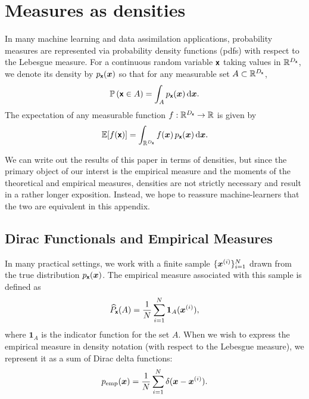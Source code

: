 \documentclass[wcp]{jmlr} %
\begin{document}



\appendix

\section{Measures as densities}\label{sec:densities-please}

In many machine learning and data assimilation applications, probability measures are represented via probability density functions (pdfs) with respect to the Lebesgue measure. For a continuous random variable \(\boldsymbol{\mathsf{x}}\) taking values in \(\mathbb{R}^{D_{\boldsymbol{\mathsf{x}}}}\), we denote its density by \(p_{\boldsymbol{\mathsf{x}}}(\boldsymbol{x})\) so that for any measurable set \(A \subset \mathbb{R}^{D_{\boldsymbol{\mathsf{x}}}}\),
\begin{equation}
    \mathbb{P}\left(\boldsymbol{\mathsf{x}} \in A\right)
    = \int_A p_{\boldsymbol{\mathsf{x}}}(\boldsymbol{x})\,\mathrm{d}\boldsymbol{x}.
\end{equation}
The expectation of any measurable function \(f:\mathbb{R}^{D_{\boldsymbol{\mathsf{x}}}}\to\mathbb{R}\) is given by
\begin{equation}
    \mathbb{E}[f(\boldsymbol{\mathsf{x}})] = \int_{\mathbb{R}^{D_{\boldsymbol{\mathsf{x}}}}} f(\boldsymbol{x})\,p_{\boldsymbol{\mathsf{x}}}(\boldsymbol{x})\,\mathrm{d}\boldsymbol{x}.
\end{equation}

We can write out the results of this paper in terms of densities, but since the primary object of our interst is the empirical measure and the moments of the theoretical and empirical measures, densities are not strictly necessary and result in a rather longer exposition.
Instead, we hope to reassure machine-learners that the two are equivalent in this appendix.

\subsection*{Dirac Functionals and Empirical Measures}

In many practical settings, we work with a finite sample \(\{\boldsymbol{x}^{(i)}\}_{i=1}^N\) drawn from the true distribution \(p_{\boldsymbol{\mathsf{x}}}(\boldsymbol{x})\). The empirical measure associated with this sample is defined as
\begin{equation}
    \widehat{P}_{\boldsymbol{\mathsf{x}}}(A) = \frac{1}{N} \sum_{i=1}^N \mathbf{1}_A(\boldsymbol{x}^{(i)}),
\end{equation}
where \(\mathbf{1}_A\) is the indicator function for the set \(A\). When we wish to express the empirical measure in density notation (with respect to the Lebesgue measure), we represent it as a sum of Dirac delta functions:
\begin{equation}
    p_{\text{emp}}(\boldsymbol{x}) = \frac{1}{N} \sum_{i=1}^N \delta(\boldsymbol{x}-\boldsymbol{x}^{(i)}).
\end{equation}
\end{document}
